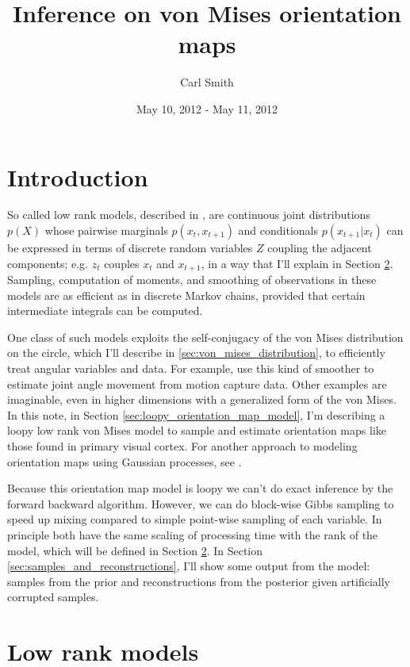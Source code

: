 \documentclass[11pt]{article}
\newcommand{\paperlink}[1]{\href{Documents/papers/#1.pdf}{\cite{#1}}}
\begin{document}
\title{Inference on von Mises orientation maps}
\author{Carl Smith}
\date{May 10, 2012 - May 11, 2012}
\maketitle

\section{Introduction}

So called low rank models, described in \paperlink{Smith_2012}, are continuous joint distributions $p(X)$ whose pairwise marginals $p(x_t,x_{t+1})$ and conditionals $p(x_{t+1}|x_t)$ can be expressed in terms of discrete random variables $Z$ coupling the adjacent components; e.g. $z_t$ couples $x_t$ and $x_{t+1}$, in a way that I'll explain in Section \ref{sec:low_rank_models}. Sampling, computation of moments, and smoothing of observations in these models are as efficient as in discrete Markov chains, provided that certain intermediate integrals can be computed.

One class of such models exploits the self-conjugacy of the von Mises distribution on the circle, which I'll describe in \ref{sec:von_mises_distribution}, to efficiently treat angular variables and data. For example, \paperlink{Smith_2012} use this kind of smoother to estimate joint angle movement from motion capture data. Other examples are imaginable, even in higher dimensions with a generalized form of the von Mises. In this note, in Section \ref{sec:loopy_orientation_map_model}, I'm describing a loopy low rank von Mises model to sample and estimate orientation maps like those found in primary visual cortex. For another approach to modeling orientation maps using Gaussian processes, see \paperlink{Macke_2009}.

Because this orientation map model is loopy we can't do exact inference by the forward backward algorithm. However, we can do block-wise Gibbs sampling to speed up mixing compared to simple point-wise sampling of each variable. In principle both have the same scaling of processing time with the rank of the model, which will be defined in Section \ref{sec:low_rank_models}. In Section \ref{sec:samples_and_reconstructions}, I'll show some output from the model: samples from the prior and reconstructions from the posterior given artificially corrupted samples.


\section{Low rank models}
\label{sec:low_rank_models}
\end{document}
